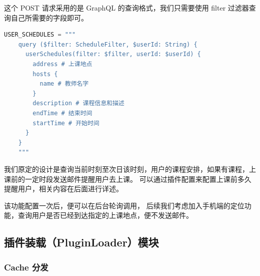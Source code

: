 \documentclass[14pt,a4paper,UTF8,twoside]{article}
\begin{document}
    这个 POST 请求采用的是 GraphQL 的查询格式，我们只需要使用 filter 过滤器查询自己所需要的字段即可。

    \begin{lstlisting}[language=python]
    USER_SCHEDULES = """
    query ($filter: ScheduleFilter, $userId: String) {
      userSchedules(filter: $filter, userId: $userId) {
        address # 上课地点
        hosts {
          name # 教师名字
        }
        description # 课程信息和描述
        endTime # 结束时间
        startTime # 开始时间
      }
    }
    """
    \end{lstlisting}

    我们原定的设计是查询当前时刻至次日该时刻，用户的课程安排，如果有课程，上课前的一定时段发送邮件提醒用户去上课。
    可以通过插件配置来配置上课前多久提醒用户，相关内容在后面进行详述。

    \begin{rmr}
        该功能配置一次后，便可以在后台轮询调用，
        后续我们考虑加入手机端的定位功能，查询用户是否已经到达指定的上课地点，便不发送邮件。
    \end{rmr}

    \newpage{}

    \subsection{插件装载（PluginLoader）模块}

    \subsubsection{Cache 分发}
\end{document}
